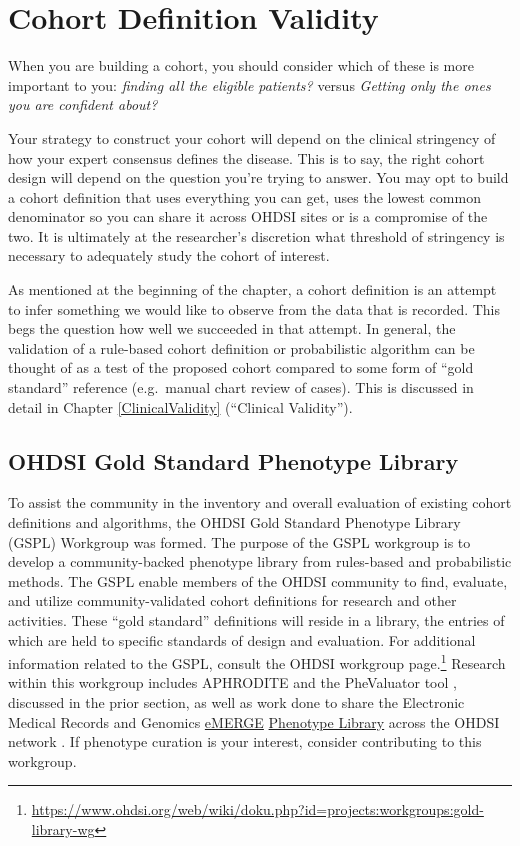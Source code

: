 \documentclass[11pt]{book}
\let\rmarkdownfootnote\footnote%
\def\footnote{\protect\rmarkdownfootnote}
\theoremstyle{definition}
\theoremstyle{definition}
\theoremstyle{definition}
\theoremstyle{remark}
\begin{document}
\section{Cohort Definition Validity}\label{cohort-definition-validity}

When you are building a cohort, you should consider which of these is
more important to you: \emph{finding all the eligible patients?} versus
\emph{Getting only the ones you are confident about?}

Your strategy to construct your cohort will depend on the clinical
stringency of how your expert consensus defines the disease. This is to
say, the right cohort design will depend on the question you're trying
to answer. You may opt to build a cohort definition that uses everything
you can get, uses the lowest common denominator so you can share it
across OHDSI sites or is a compromise of the two. It is ultimately at
the researcher's discretion what threshold of stringency is necessary to
adequately study the cohort of interest.

As mentioned at the beginning of the chapter, a cohort definition is an
attempt to infer something we would like to observe from the data that
is recorded. This begs the question how well we succeeded in that
attempt. In general, the validation of a rule-based cohort definition or
probabilistic algorithm can be thought of as a test of the proposed
cohort compared to some form of ``gold standard'' reference (e.g.~manual
chart review of cases). This is discussed in detail in Chapter
\ref{ClinicalValidity} (``Clinical Validity'').

\subsection{OHDSI Gold Standard Phenotype
Library}\label{ohdsi-gold-standard-phenotype-library}

To assist the community in the inventory and overall evaluation of
existing cohort definitions and algorithms, the OHDSI Gold Standard
Phenotype Library (GSPL) Workgroup was formed. The purpose of the GSPL
workgroup is to develop a community-backed phenotype library from
rules-based and probabilistic methods. The GSPL enable members of the
OHDSI community to find, evaluate, and utilize community-validated
cohort definitions for research and other activities. These ``gold
standard'' definitions will reside in a library, the entries of which
are held to specific standards of design and evaluation. For additional
information related to the GSPL, consult the OHDSI workgroup
page.\footnote{\url{https://www.ohdsi.org/web/wiki/doku.php?id=projects:workgroups:gold-library-wg}}
Research within this workgroup includes APHRODITE
\citep{Banda2017APHRODITE} and the PheValuator tool
\citep{Swerdel2019phevaluator} , discussed in the prior section, as well
as work done to share the Electronic Medical Records and Genomics
\href{https://emerge.mc.vanderbilt.edu/}{eMERGE}
\href{https://phekb.org/phenotypes}{Phenotype Library} across the OHDSI
network \citep{Hripcsak2019eMERGE}. If phenotype curation is your
interest, consider contributing to this workgroup.
\end{document}
